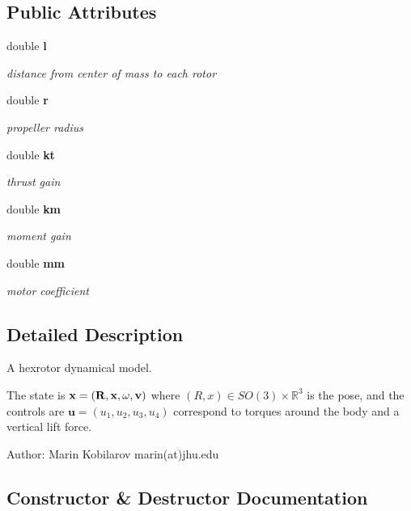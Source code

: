 \subsection*{\-Public \-Attributes}
\begin{DoxyCompactItemize}
\item 
double {\bf l}
\begin{DoxyCompactList}\small\item\em distance from center of mass to each rotor \end{DoxyCompactList}\item 
double {\bf r}
\begin{DoxyCompactList}\small\item\em propeller radius \end{DoxyCompactList}\item 
double {\bf kt}
\begin{DoxyCompactList}\small\item\em thrust gain \end{DoxyCompactList}\item 
double {\bf km}
\begin{DoxyCompactList}\small\item\em moment gain \end{DoxyCompactList}\item 
double {\bf mm}
\begin{DoxyCompactList}\small\item\em motor coefficient \end{DoxyCompactList}\end{DoxyCompactItemize}


\subsection{\-Detailed \-Description}
\-A hexrotor dynamical model.

\-The state is $ \bf x = (R, x, \omega, v) $ where $ (R,x)\in SO(3)\times\mathbb{R}^3$ is the pose, and the controls are $ \bm u = (u_1,u_2,u_3,u_4)$ correspond to torques around the body and a vertical lift force.

\-Author\-: \-Marin \-Kobilarov marin(at)jhu.\-edu 

\subsection{\-Constructor \& \-Destructor \-Documentation}
